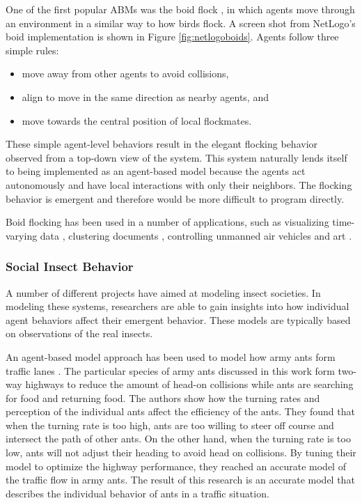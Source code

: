 One of the first popular ABMs was the boid flock \cite{reynolds1987}\cite{reynolds1999sba}, in which agents move through an environment in a similar way to how birds flock.
A screen shot from NetLogo's boid implementation \cite{flocking} is shown in Figure \ref{fig:netlogoboids}.
Agents follow three simple rules:
   \begin{itemize}
      \item move away from other agents to avoid collisions,
      \item align to move in the same direction as nearby agents, and
      \item move towards the central position of local flockmates.
   \end{itemize}
These simple agent-level behaviors result in the elegant flocking behavior observed from a top-down view of the system.
This system naturally lends itself to being implemented as an agent-based model because the agents act autonomously and have local interactions with only their neighbors.
The flocking behavior is emergent and therefore would be more difficult to program directly.

Boid flocking has been used in a number of applications, such as visualizing time-varying data \cite{1382896}, clustering documents \cite{cui2006flocking}, controlling unmanned air vehicles \cite{crowther2003flocking} and art \cite{Boyd}.

\subsubsection{Social Insect Behavior}

A number of different projects have aimed at modeling insect societies.
In modeling these systems, researchers are able to gain insights into how individual agent behaviors affect their emergent behavior.
These models are typically based on observations of the real insects.

An agent-based model approach has been used to model how army ants form traffic lanes \cite{couzin2003sol}.
The particular species of army ants discussed in this work form two-way highways to reduce the amount of head-on collisions while ants are searching for food and returning food.
The authors show how the turning rates and perception of the individual ants affect the efficiency of the ants.
They found that when the turning rate is too high, ants are too willing to steer off course and intersect the path of other ants.
On the other hand, when the turning rate is too low, ants will not adjust their heading to avoid head on collisions.
By tuning their model to optimize the highway performance, they reached an accurate model of the traffic flow in army ants.
The result of this research is an accurate model that describes the individual behavior of ants in a traffic situation.

